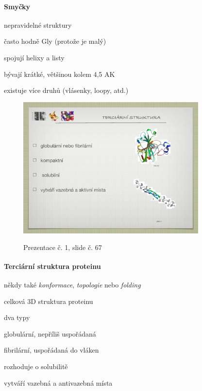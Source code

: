 \documentclass[DIV=8]{scrreprt}
\begin{document}
\paragraph{Smyčky}
\begin{myItemize}[nosep]
    \item nepravidelné struktury
    \item často hodně Gly (protože je malý)
    \item spojují helixy a listy
    \item bývají krátké, většinou kolem 4,5 AK
    \item existuje více druhů (vlásenky, loopy, atd.)
\end{myItemize}



\begin{figure}
    \caption{Prezentace č. 1, slide č. 67}
    \includegraphics[width=0.85\textwidth]{slides-1/slide-67.jpg}
    \centering
    \label{slides-1-slide-67}
\end{figure}

\paragraph{Terciární struktura proteinu}
\begin{myItemize}[nosep]
    \item někdy také \emph{konformace}, \emph{topologie} nebo \emph{folding}
    \item celková 3D struktura proteinu
    \item dva typy
\begin{myItemize}[nosep]
    \item globulární, nepříliš uspořádaná
    \item fibrilární, uspořádaná do vláken
\end{myItemize}

    \item rozhoduje o solubilitě
    \item vytváří vazebná a antivazebná místa
\end{myItemize}
\end{document}
